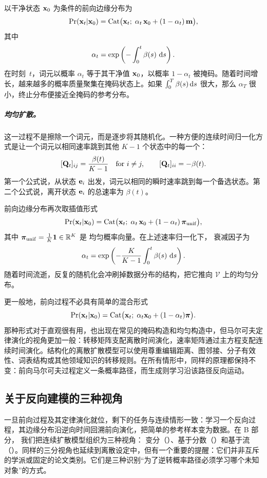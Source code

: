 以干净状态 ${\mathbf{x}}_0$ 为条件的前向边缘分布为
      \[
      \Pr({\mathbf{x}}_t | {\mathbf{x}}_0)
      = \mathrm{Cat}\bigl({\mathbf{x}}_t;\;
          \alpha_t\,{\mathbf{x}}_0 + (1-\alpha_t)\,{\mathbf{m}}\bigr),
      \]
      其中
      \[
      \alpha_t
      =
      \exp\left(-\int_0^t\beta(s)\,\mathop{}\!\mathrm{d} s\right).
      \]
在时刻~$t$，词元以概率 $\alpha_t$ 等于其干净值 ${\mathbf{x}}_0$，以概率 $1-\alpha_t$ 被掩码。随着时间增长，越来越多的概率质量聚集在掩码状态上。如果 $\int_0^T\beta(s)\mathop{}\!\mathrm{d} s$ 很大，那么 $\alpha_T$ 很小，终止分布便接近全掩码的参考分布。

\subparagraph{均匀扩散。} 这一过程不是擦除一个词元，而是逐步将其随机化。一种方便的连续时间归一化方式是让一个词元以相同速率跳到其他 $K-1$ 个状态中的每一个：
      \[
      [{\mathbf{Q}}_t]_{ij} = \frac{\beta(t)}{K - 1}
      \quad\text{for } i \neq j,
      \qquad
      [{\mathbf{Q}}_t]_{ii} = -\beta(t).
      \]
第一个公式说，从状态 ${\mathbf{e}}_i$ 出发，词元以相同的瞬时速率跳到每一个备选状态。第二个公式说，离开状态 ${\mathbf{e}}_i$ 的总速率为 $\beta(t)$。

前向边缘分布再次取插值形式
      \[
      \Pr({\mathbf{x}}_t|{\mathbf{x}}_0)
      = \mathrm{Cat} \bigl({\mathbf{x}}_t;\;
          \alpha_t\,{\mathbf{x}}_0 + (1-\alpha_t)\,\bm{\pi}_{\mathrm{unif}}
        \bigr),
      \]
      其中
      $\bm{\pi}_{\mathrm{unif}}=\tfrac{1}{K}\mathbf{1}\in\mathbb{R}^K$ 是
      均匀概率向量。在上述速率归一化下，
      衰减因子为
      \[
      \alpha_t
      =
      \exp\left(
      -\frac{K}{K-1}\int_0^t \beta(s)\,\mathop{}\!\mathrm{d} s
      \right).
      \]
随着时间流逝，反复的随机化会冲刷掉数据分布的结构，把它推向 $\mathcal{V}$ 上的均匀分布。

更一般地，前向过程不必具有简单的混合形式
\[
\Pr({\mathbf{x}}_t|{\mathbf{x}}_0)
= \mathrm{Cat}\bigl({\mathbf{x}}_t;\;\alpha_t{\mathbf{x}}_0+(1-\alpha_t)\bm{\pi}\bigr).
\]
那种形式对于直观很有用，也出现在常见的掩码构造和均匀构造中，但马尔可夫定律演化的视角更加一般：转移矩阵支配离散时间演化，速率矩阵通过主方程支配连续时间演化。结构化的离散扩散模型可以使用尊重编辑距离、图邻接、分子有效性、词表结构或其他领域知识的转移规则。在所有情形中，同样的原理都保持不变：前向马尔可夫过程定义一条概率路径，而生成则学习沿该路径反向运动。

\subsection{关于反向建模的三种视角}
\label{subsec:epilogue-three-views}

一旦前向过程及其定律演化就位，剩下的任务与连续情形一致：学习一个反向过程，其边缘分布沿逆向时间回溯前向演化，把简单的参考样本变为数据。在 B 部分，
我们把连续扩散模型组织为三种视角：
变分（）、基于分数（）和基于流
（）。同样的三分视角也延续到离散设定中，但有一个重要的提醒：它们并非互斥的学派或固定的论文类别。它们是三种识别``为了逆转概率路径必须学习哪个未知对象''的方式。


